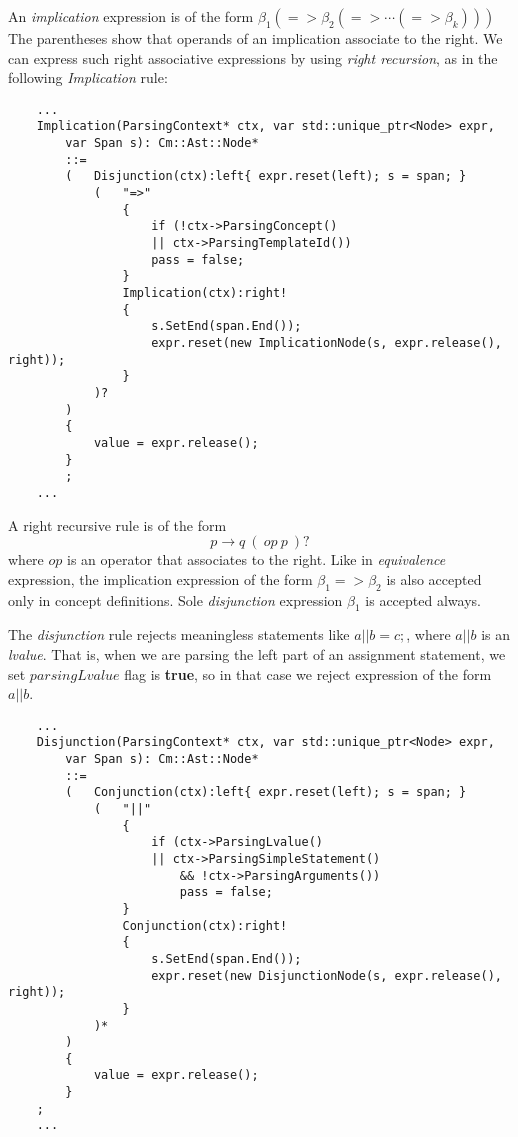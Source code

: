 \documentclass[a4paper,oneside,11pt]{book}
\theoremstyle{definition}
\begin{document}
An \emph{implication} expression is of the form $\beta_1 (=> \beta_2 (=> \cdots (=> \beta_k)))$
The parentheses show that operands of an implication associate to the right.
We can express such right associative expressions by using \emph{right recursion},
as in the following \emph{Implication} rule:

\lstset{language=cmpg}
\begin{lstlisting}
    ...
    Implication(ParsingContext* ctx, var std::unique_ptr<Node> expr,
        var Span s): Cm::Ast::Node*
        ::=
        (   Disjunction(ctx):left{ expr.reset(left); s = span; }
            (   "=>"
                {
                    if (!ctx->ParsingConcept()
                    || ctx->ParsingTemplateId())
                    pass = false;
                }
                Implication(ctx):right!
                {
                    s.SetEnd(span.End());
                    expr.reset(new ImplicationNode(s, expr.release(), right));
                }
            )?
        )
        {
            value = expr.release();
        }
        ;
    ...
\end{lstlisting}

A right recursive rule is of the form $$p \rightarrow q \> ( \> op \> p \>)?$$ where $op$ is an operator that associates to the right.
Like in \emph{equivalence} expression, the implication expression of the form $\beta_1 => \beta_2$ is also accepted only in concept definitions.
Sole \emph{disjunction} expression $\beta_1$ is accepted always.

The \emph{disjunction } rule rejects meaningless statements like $a || b = c;$, where $a || b$ is an \emph{lvalue}.
That is, when we are parsing the left part of an assignment statement, we set $parsingLvalue$ flag is \textbf{true},
so in that case we reject expression of the form $a || b$.

\lstset{language=cmpg}
\begin{lstlisting}
    ...
    Disjunction(ParsingContext* ctx, var std::unique_ptr<Node> expr,
        var Span s): Cm::Ast::Node*
        ::=
        (   Conjunction(ctx):left{ expr.reset(left); s = span; }
            (   "||"
                {
                    if (ctx->ParsingLvalue()
                    || ctx->ParsingSimpleStatement()
                        && !ctx->ParsingArguments())
                        pass = false;
                }
                Conjunction(ctx):right!
                {
                    s.SetEnd(span.End());
                    expr.reset(new DisjunctionNode(s, expr.release(), right));
                }
            )*
        )
        {
            value = expr.release();
        }
    ;
    ...
\end{lstlisting}
\end{document}
